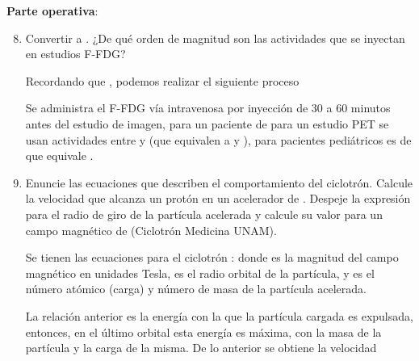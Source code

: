 \textbf{Parte operativa}:

\begin{enumerate}[1.]
  \setcounter{enumi}{7}
  \item  Convertir  a . ¿De qué orden de magnitud son las actividades que se inyectan en  estudios F-FDG?
  

Recordando que , podemos realizar el siguiente proceso


 Se administra el  F-FDG vía intravenosa por inyección de 30 a 60 minutos antes del estudio de imagen, para un paciente de  para un estudio PET se usan actividades entre  y  (que equivalen a  y ), para pacientes pediátricos es de  que equivale  \citep{fdg_f18}.



  \item Enuncie las ecuaciones que describen el comportamiento del ciclotrón. Calcule la velocidad que alcanza un protón en un acelerador de . Despeje la expresión para el radio de giro de la partícula acelerada y calcule su valor para un campo magnético de  (Ciclotrón Medicina UNAM).
  

Se tienen las ecuaciones para el ciclotrón \citep{cherry,cyclo}:
donde  es la magnitud del campo magnético en unidades Tesla,  es el radio orbital de la partícula,  y  es el número atómico (carga) y número de masa de la partícula acelerada.

La relación anterior es la energía con la que la partícula cargada es expulsada, entonces, en el último orbital esta energía es máxima, con  la masa de la partícula y  la carga de la misma. De lo anterior se obtiene la velocidad




\end{enumerate}
